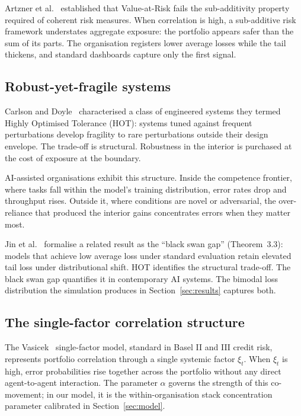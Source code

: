\documentclass[11pt,a4paper]{article}
\begin{document}
Artzner et al.~\cite{artzner_mf_1999} established that Value-at-Risk fails
the sub-additivity property required of coherent risk measures. When
correlation is high, a sub-additive risk framework understates aggregate
exposure: the portfolio appears safer than the sum of its parts. The
organisation registers lower average losses while the tail thickens, and
standard dashboards capture only the first signal.

\subsection{Robust-yet-fragile systems}

Carlson and Doyle~\cite{carlson_prl_2000} characterised a class of
engineered systems they termed Highly Optimised Tolerance (HOT): systems
tuned against frequent perturbations develop fragility to rare perturbations
outside their design envelope. The trade-off is structural. Robustness in
the interior is purchased at the cost of exposure at the boundary.

AI-assisted organisations exhibit this structure. Inside the competence
frontier, where tasks fall within the model's training distribution, error
rates drop and throughput rises. Outside it, where conditions are novel or
adversarial, the over-reliance that produced the interior gains concentrates
errors when they matter most.

Jin et al.~\cite{jin_icml_2025} formalise a related result as the ``black
swan gap'' (Theorem~3.3): models that achieve low average loss under
standard evaluation retain elevated tail loss under distributional shift. HOT
identifies the structural trade-off. The black swan gap quantifies it in
contemporary AI systems. The bimodal loss distribution the simulation
produces in Section~\ref{sec:results} captures both.

\subsection{The single-factor correlation structure}

The Vasicek~\cite{vasicek_risk_2002} single-factor model, standard in Basel
II and III credit risk, represents portfolio correlation through a single
systemic factor $\xi_t$. When $\xi_t$ is high, error probabilities rise
together across the portfolio without any direct agent-to-agent interaction.
The parameter $\alpha$ governs the strength of this co-movement; in our
model, it is the within-organisation stack concentration parameter calibrated
in Section~\ref{sec:model}.
\end{document}
